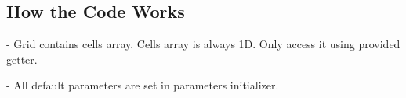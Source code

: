 	








\subsection{How the Code Works}




- Grid contains cells array. Cells array is always 1D. Only access it using
provided getter.

- All default parameters are set in parameters initializer.



